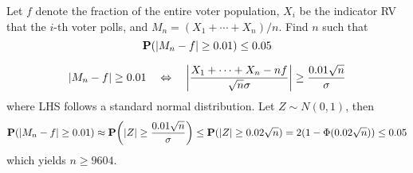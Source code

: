 \begin{example}
    Let $f$ denote the fraction of the entire voter population, $X_i$ be the indicator RV that the $i$-th voter polls, and $M_n = (X_1 + \cdots + X_n) / n$. Find $n$ such that
    \begin{equation}
        \mathbf{P}(\abs{M_n - f} \geq 0.01) \leq 0.05
    \end{equation}
\end{example}
\begin{solution}
    \begin{equation}
        \abs{M_n - f} \geq 0.01 \quad\Leftrightarrow\quad \abs{\frac{X_1 + \cdots + X_n - nf}{\sqrt{n}\sigma}} \geq \frac{0.01 \sqrt{n}}{\sigma}
    \end{equation}
    where LHS follows a standard normal distribution. Let $Z \sim N(0, 1)$, then
    \begin{equation}
        \mathbf{P}(\abs{M_n - f} \geq 0.01) \approx \mathbf{P}\qty(\abs{Z} \geq \frac{0.01 \sqrt{n}}{\sigma}) \leq \mathbf{P}(\abs{Z} \geq 0.02\sqrt{n}) = 2(1 - \Phi(0.02\sqrt{n})) \leq 0.05
    \end{equation}
    which yields $n \geq 9604$.
\end{solution}

